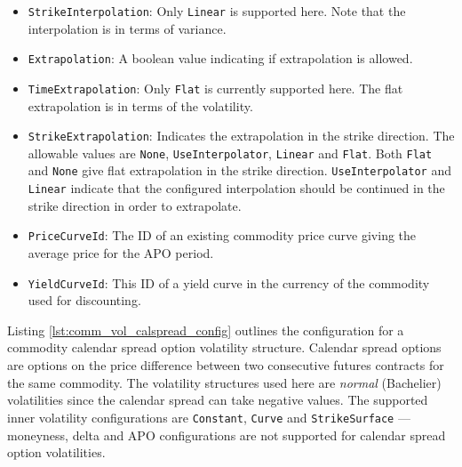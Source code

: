 \begin{itemize}
\item \lstinline!StrikeInterpolation!:
Only \lstinline!Linear! is supported here. Note that the interpolation is in terms of variance.

\item \lstinline!Extrapolation!:
A boolean value indicating if extrapolation is allowed.

\item \lstinline!TimeExtrapolation!:
Only \lstinline!Flat! is currently supported here. The flat extrapolation is in terms of the volatility.

\item \lstinline!StrikeExtrapolation!:
Indicates the extrapolation in the strike direction. The allowable values are \lstinline!None!, \lstinline!UseInterpolator!, \lstinline!Linear! and \lstinline!Flat!. Both \lstinline!Flat! and \lstinline!None! give flat extrapolation in the strike direction. \lstinline!UseInterpolator! and \lstinline!Linear! indicate that the configured interpolation should be continued in the strike direction in order to extrapolate.

\item \lstinline!PriceCurveId!:
The ID of an existing commodity price curve giving the average price for the APO period.

\item \lstinline!YieldCurveId!:
This ID of a yield curve in the currency of the commodity used for discounting.

\end{itemize}

Listing \ref{lst:comm_vol_calspread_config} outlines the configuration for a commodity calendar spread option volatility structure. Calendar spread options are options on the price difference between two consecutive futures contracts for the same commodity. The volatility structures used here are \emph{normal} (Bachelier) volatilities since the calendar spread can take negative values. The supported inner volatility configurations are \lstinline!Constant!, \lstinline!Curve! and \lstinline!StrikeSurface! --- moneyness, delta and APO configurations are not supported for calendar spread option volatilities.

